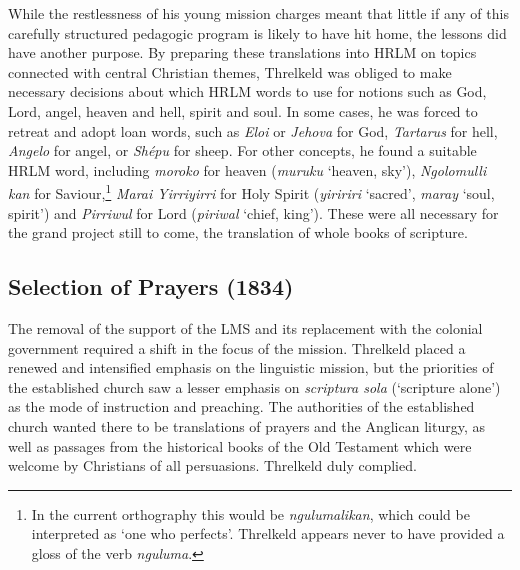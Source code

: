 {While the restlessness of his young mission charges meant that little if any of this carefully structured pedagogic program is likely to have hit home, the lessons did have another purpose. By preparing these translations into HRLM on topics connected with central Christian themes, Threlkeld was obliged to make necessary decisions about which HRLM words to use for notions such as God, Lord, angel, heaven and hell, spirit and soul. In some cases, he was forced to retreat and adopt loan words, such as \textit{Eloi} or \textit{Jehova} for God, \textit{Tartarus} for hell, \textit{Angelo} for angel, or \textit{Shépu} for sheep. For other concepts, he found a suitable HRLM word, including \textit{moroko} for heaven (\textit{muruku} ‘heaven, sky’), \textit{Ngolomulli kan} for Saviour,\footnote{In the current orthography this would be \textit{ngulumalikan}, which could be interpreted as ‘one who perfects’. Threlkeld appears never to have provided a gloss of the verb \textit{nguluma}.} \textit{Marai Yirriyirri} for Holy Spirit (\textit{yiririri} ‘sacred’, \textit{maray} ‘soul, spirit’) and \textit{Pirriwul} for Lord (\textit{piriwal} ‘chief, king’). These were all necessary for the grand project still to come, the translation of whole books of scripture.

\subsection{Selection of Prayers (1834)}

The removal of the support of the LMS and its replacement with the colonial government required a shift in the focus of the mission. Threlkeld placed a renewed and intensified emphasis on the linguistic mission, but the priorities of the established church saw a lesser emphasis on \textit{scriptura sola} (‘scripture alone’) as the mode of instruction and preaching. The authorities of the established church wanted there to be translations of prayers and the Anglican liturgy, as well as passages from the historical books of the Old Testament which were welcome by Christians of all persuasions. Threlkeld duly complied.

}
